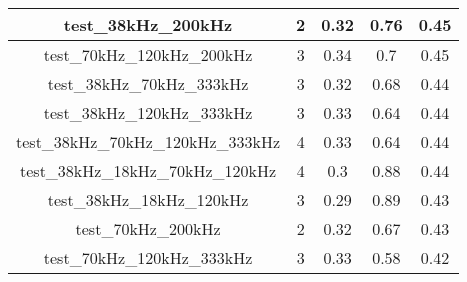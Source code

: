 \begin{longtable}{|c|c|c|c|c|}
test\_38kHz\_200kHz                               & 2                                                                                              & 0.32                                    & 0.76                                 & 0.45                                    \\ \hline
test\_70kHz\_120kHz\_200kHz                       & 3                                                                                              & 0.34                                    & 0.7                                  & 0.45                                    \\ \hline
test\_38kHz\_70kHz\_333kHz                        & 3                                                                                              & 0.32                                    & 0.68                                 & 0.44                                    \\ \hline
test\_38kHz\_120kHz\_333kHz                       & 3                                                                                              & 0.33                                    & 0.64                                 & 0.44                                    \\ \hline
test\_38kHz\_70kHz\_120kHz\_333kHz                & 4                                                                                              & 0.33                                    & 0.64                                 & 0.44                                    \\ \hline
test\_38kHz\_18kHz\_70kHz\_120kHz                 & 4                                                                                              & 0.3                                     & 0.88                                 & 0.44                                    \\ \hline
test\_38kHz\_18kHz\_120kHz                        & 3                                                                                              & 0.29                                    & 0.89                                 & 0.43                                    \\ \hline
test\_70kHz\_200kHz                               & 2                                                                                              & 0.32                                    & 0.67                                 & 0.43                                    \\ \hline
test\_70kHz\_120kHz\_333kHz                       & 3                                                                                              & 0.33                                    & 0.58                                 & 0.42                                    \\ \hline

\end{longtable}
